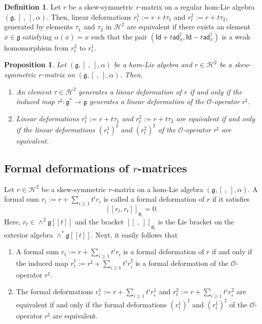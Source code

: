 \documentclass[a4paper,11pt]{amsart}
\theoremstyle{plain}
\newtheorem{proposition}[theorem]{Proposition}
\theoremstyle{definition}
\newtheorem{definition}[theorem]{Definition}
\theoremstyle{remark}
\numberwithin{equation}{section}
\begin{document}
\begin{definition}
Let $r$ be a skew-symmetric $r$-matrix on a regular hom-Lie algebra $(\mathfrak{g},[~,~],\alpha)$. Then, linear deformations $r^1_t:=r+t\tau_1$ and $r^2_t:=r+t\tau_2$, generated by elements $\tau_1$ and $\tau_2$ in $\mathcal{H}^2$ are equivalent if there exists an element $x\in \mathfrak{g}$ satisfying $\alpha(x)=x$ such that the pair $(\mathsf{Id}+t \mathsf{ad}_x^{\dagger},\mathsf{Id}-t \mathsf{ad}_x^{\dagger})$ is a weak homomorphism from $r^2_t$ to $r^1_t$.
\end{definition}

\begin{proposition}
Let $(\mathfrak{g},[~,~],\alpha)$ be a hom-Lie algebra and $r\in \mathcal{H}^2$ be a skew-symmetric $r$-matrix on $(\mathfrak{g},[~,~],\alpha)$. Then,
\begin{enumerate}
\item An element $\tau\in \mathcal{H}^2$ generates a linear deformation of $r$ if and only if the induced map $\tau^\sharp:\mathfrak{g}^*\rightarrow\mathfrak{g}$ generates a linear deformation of the $\mathcal{O}$-operator $r^{\sharp}$.
\item Linear deformations $r^1_t:=r+t\tau_1$ and $r^2_t:=r+t\tau_2$ are equivalent if and only if the linear deformations $(r^1_t)^\sharp$ and $(r^2_t)^\sharp$ of the $\mathcal{O}$-operator $r^{\sharp}$ are equivalent.
\end{enumerate}
\end{proposition}

\subsection*{Formal deformations of $r$-matrices}
Let $r\in \mathcal{H}^2$ be a skew-symmetric $r$-matrix on a hom-Lie algebra $(\mathfrak{g},[~,~],\alpha)$. A formal sum $\textstyle{r_t:=r+\sum_{i\geq 1} t^i r_i}$ is called a formal deformation of $r$ if it satisfies 
$$[[r_t,r_t]]_{\mathfrak{g}_t}=0.$$
Here, $r_t\in \wedge^2\mathfrak{g}[[t]]$ and the bracket $[[~,~]]_{\mathfrak{g}_t}$ is the Lie bracket on the exterior algebra $\wedge^*\mathfrak{g}[[t]]$. 
Next, it easily follows that 
\begin{enumerate}
\item A formal sum $\textstyle{r_t:=r+\sum_{i\geq 1} t^i r_i}$ is a formal deformation of $r$ if and only if the induced map $r_t^{\sharp}:=r^{\sharp}+\sum_{i\geq 1} t^i r_i^\sharp$ is a formal deformation of the $\mathcal{O}$-operator $r^{\sharp}$.

\item The formal deformations $r^1_t:=r+\sum_{i\geq 1} t^i r^1_i$ and $r^2_t:=r+\sum_{i\geq 1} t^i r^2_i$ are equivalent if and only if the formal deformations $(r^1_t)^{\sharp}$ and $(r^1_t)^\sharp$ of the $\mathcal{O}$-operator $r^{\sharp}$ are equivalent.

\end{enumerate}
\end{document}
